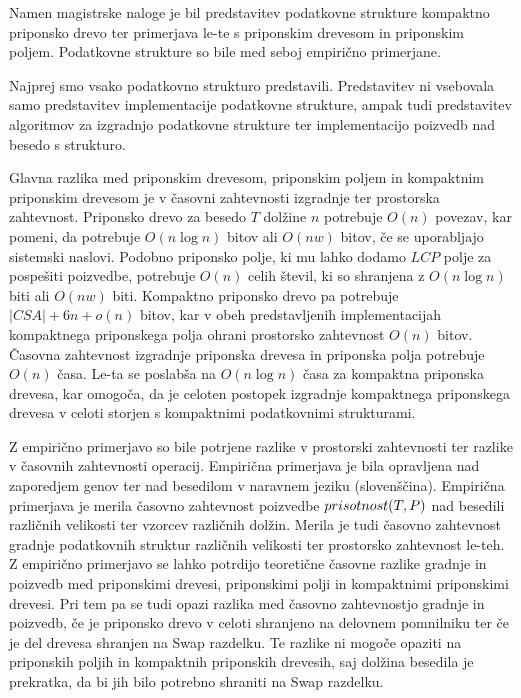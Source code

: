 Namen magistrske naloge je bil predstavitev podatkovne strukture kompaktno priponsko drevo ter primerjava le-te s priponskim drevesom in priponskim poljem. Podatkovne strukture so bile med seboj empirično primerjane.

Najprej smo vsako podatkovno strukturo predstavili. Predstavitev ni vsebovala samo predstavitev implementacije podatkovne strukture, ampak tudi predstavitev algoritmov za izgradnjo podatkovne strukture ter implementacijo poizvedb nad besedo s strukturo.

Glavna razlika med priponskim drevesom, priponskim poljem in kompaktnim priponskim drevesom je v časovni zahtevnosti izgradnje ter prostorska zahtevnost. Priponsko drevo za besedo $T$ dolžine $n$ potrebuje $O(n)$ povezav, kar pomeni, da potrebuje $O(n\log{n})$ bitov ali $O(nw)$ bitov, če se uporabljajo sistemski naslovi. Podobno priponsko polje, ki mu lahko dodamo $LCP$ polje za pospešiti poizvedbe, potrebuje $O(n)$ celih števil, ki so shranjena z $O(n\log{n})$ biti ali $O(nw)$ biti. Kompaktno priponsko drevo pa potrebuje $|CSA|+6n+o(n)$ bitov, kar v obeh predstavljenih implementacijah kompaktnega priponskega polja ohrani prostorsko zahtevnost $O(n)$ bitov. Časovna zahtevnost izgradnje priponska drevesa in priponska polja potrebuje $O(n)$ časa. Le-ta se poslabša na $O(n\log{n})$ časa za kompaktna priponska drevesa, kar omogoča, da je celoten postopek izgradnje kompaktnega priponskega drevesa v celoti storjen s kompaktnimi podatkovnimi strukturami.

Z empirično primerjavo so bile potrjene razlike v prostorski zahtevnosti ter razlike v časovnih zahtevnosti operacij. Empirična primerjava je bila opravljena nad zaporedjem genov ter nad besedilom v naravnem jeziku (slovenščina). Empirična primerjava je merila časovno zahtevnost poizvedbe $ \mathop{prisotnost}(T,P) $ nad besedili različnih velikosti ter vzorcev različnih dolžin. Merila je tudi časovno zahtevnost gradnje podatkovnih struktur različnih velikosti ter prostorsko zahtevnost le-teh. Z empirično primerjavo se lahko potrdijo teoretične časovne razlike gradnje in poizvedb med priponskimi drevesi, priponskimi polji in kompaktnimi priponskimi drevesi. Pri tem pa se tudi opazi razlika med časovno zahtevnostjo gradnje in poizvedb, če je priponsko drevo v celoti shranjeno na delovnem pomnilniku ter če je del drevesa shranjen na Swap razdelku. Te razlike ni mogoče opaziti na priponskih poljih in kompaktnih priponskih drevesih, saj dolžina besedila je prekratka, da bi jih bilo potrebno shraniti na Swap razdelku.

